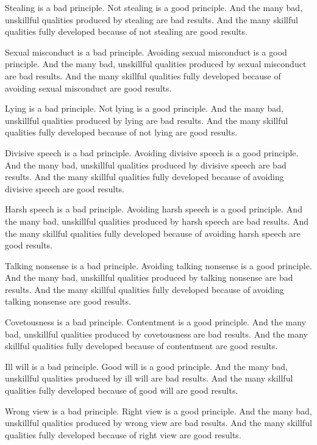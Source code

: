 \documentclass[12pt,openany]{book}%
\begin{document}
Stealing is a bad principle. Not stealing is a good principle. And the many bad, unskillful qualities produced by stealing are bad results. And the many skillful qualities fully developed because of not stealing are good results. 

Sexual misconduct is a bad principle. Avoiding sexual misconduct is a good principle. And the many bad, unskillful qualities produced by sexual misconduct are bad results. And the many skillful qualities fully developed because of avoiding sexual misconduct are good results. 

Lying is a bad principle. Not lying is a good principle. And the many bad, unskillful qualities produced by lying are bad results. And the many skillful qualities fully developed because of not lying are good results. 

Divisive speech is a bad principle. Avoiding divisive speech is a good principle. And the many bad, unskillful qualities produced by divisive speech are bad results. And the many skillful qualities fully developed because of avoiding divisive speech are good results. 

Harsh speech is a bad principle. Avoiding harsh speech is a good principle. And the many bad, unskillful qualities produced by harsh speech are bad results. And the many skillful qualities fully developed because of avoiding harsh speech are good results. 

Talking nonsense is a bad principle. Avoiding talking nonsense is a good principle. And the many bad, unskillful qualities produced by talking nonsense are bad results. And the many skillful qualities fully developed because of avoiding talking nonsense are good results. 

Covetousness is a bad principle. Contentment is a good principle. And the many bad, unskillful qualities produced by covetousness are bad results. And the many skillful qualities fully developed because of contentment are good results. 

Ill will is a bad principle. Good will is a good principle. And the many bad, unskillful qualities produced by ill will are bad results. And the many skillful qualities fully developed because of good will are good results. 

Wrong view is a bad principle. Right view is a good principle. And the many bad, unskillful qualities produced by wrong view are bad results. And the many skillful qualities fully developed because of right view are good results. 
\end{document}

